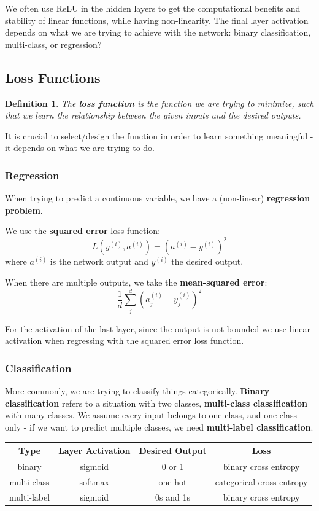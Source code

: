 \documentclass[11pt]{article}
\newtheorem{defn}{Definition}
\begin{document}
We often use ReLU in the hidden layers to get the computational benefits and stability of linear functions, while having non-linearity.
The final layer activation depends on what we are trying to achieve with the network: binary classification, multi-class, or regression? 

\subsection{Loss Functions}
\begin{defn}
  The \textbf{loss function} is the function we are trying to minimize, such that we learn the relationship between the given inputs and the desired outputs.
\end{defn}

It is crucial to select/design the function in order to learn something meaningful - it depends on what we are trying to do.

\subsubsection{Regression}
When trying to predict a continuous variable, we have a (non-linear) \textbf{regression problem}.

We use the \textbf{squared error} loss function:
\[
  L(y^{(i)}, a^{(i)})  = (a^{(i)} - y^{(i)})^2
\]
where $a^{(i)}$ is the network output and $y^{(i)}$ the desired output.

When there are multiple outputs, we take the \textbf{mean-squared error}:
\[
  \frac{1}{d} \sum_j^d (a_j^{(i)} - y_j^{(i)})^2 
\]

For the activation of the last layer, since the output is not bounded we use linear activation when regressing with the squared error loss function.

\subsubsection{Classification}
More commonly, we are trying to classify things categorically.
\textbf{Binary classification} refers to a situation with two classes, \textbf{multi-class classification} with many classes.
We assume every input belongs to one class, and one class only - if we want to predict multiple classes, we need \textbf{multi-label classification}.

\begin{center}
  \begin{tabular}{c | c | c | c}
    Type & Layer Activation & Desired Output & Loss \\
    \hline
    binary & sigmoid & 0 or 1 & binary cross entropy \\
    multi-class & softmax & one-hot & categorical cross entropy \\
    multi-label & sigmoid & 0s and 1s & binary cross entropy
  \end{tabular}
\end{center}
\end{document}
